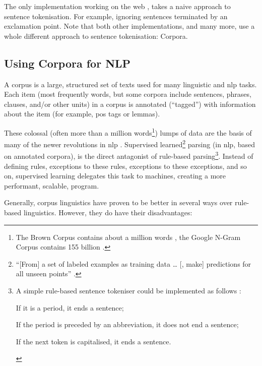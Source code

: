 \begin{enumerate}
The only implementation working on the web
\autocite{jbrooksuk/node-summary-source-code}, takes a naive approach to
sentence tokenisation. For example, ignoring sentences terminated by an
exclamation point. Note that both other implementations, and many more,
use a whole different approach to sentence tokenisation: Corpora.

\subsection{Using Corpora for NLP}\label{using-corpora-for}

A corpus is a large, structured set of texts used for many linguistic
and \gls{nlp} tasks. Each item (most frequently words, but
some corpora include sentences, phrases, clauses, and\slash or other units)
in a corpus is annotated (``tagged'') with information about the item (for
example, \gls{pos} tags or lemmas).

These colossal (often more than a million words\footnote{The Brown Corpus
  contains about a million words \autocite{francis-nelson-brown-corpus},
  the Google N-Gram Corpus contains 155 billion
  \autocite{brants-thorsten-google-ngram-corpus}.}) lumps of
data are the basis of many of the newer revolutions in \gls{nlp}
\autocite[see][]{mitkov-ruslan-ea-importance-corpora}. Supervised
learned\footnote{``{[}From{]} a set of labeled examples as training data
  \ldots{} {[}, make{]} predictions for all unseen points''
  \autocite{mohri-mehryar-foundations-machine-learning}.} parsing (in
\gls{nlp}, based on annotated corpora), is the direct antagonist of
rule-based parsing\footnote{A simple rule-based sentence tokeniser could
  be implemented as follows
  \autocite{attivio.com-doing-things-with-sentences}:

  \begin{aenumerate}
  \item
    If it is a period, it ends a sentence;
  \item
    If the period is preceded by an abbreviation, it does not end a
    sentence;
  \item
    If the next token is capitalised, it ends a sentence.
  \end{aenumerate}}. Instead of defining rules, exceptions to these rules,
exceptions to these exceptions, and so on, supervised learning delegates
this task to machines, creating a more performant, scalable, program.

Generally, corpus linguistics have proven to be better in several ways
over rule-based linguistics. However, they do have their disadvantages:


\end{enumerate}
